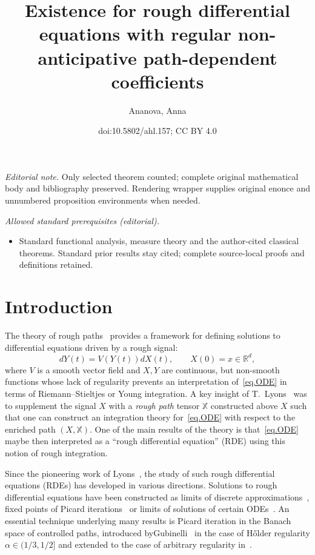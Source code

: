 \documentclass[10pt]{amsart}
\title{Existence for rough differential equations with regular non-anticipative path-dependent coefficients}
\author{Ananova, Anna}
\date{doi:10.5802/ahl.157; CC BY 4.0}
\theoremstyle{definition}\newtheorem{defi}[theo]{Definition}\newtheorem{rema}[theo]{Remark}\newtheorem{exam}[theo]{Example}\newtheorem{exem}[theo]{Example}\newtheorem{nota}[theo]{Notation}
\newcommand{\bbX}{\mathbb{X}}
\newcommand{\Rr}{{\mathbb{R}}}
\begin{document}
\maketitle
\noindent\textit{Editorial note.} Only selected theorem counted; complete original mathematical body and bibliography preserved. Rendering wrapper supplies original enonce and unnumbered proposition environments when needed.\par\medskip
\noindent\textit{Allowed standard prerequisites (editorial).}\begin{itemize}
\item Standard functional analysis, measure theory and the author-cited classical theorems. Standard prior results stay cited; complete source-local proofs and definitions retained.
\end{itemize}\medskip




\section{Introduction}

The theory of rough paths~\cite{lyons} provides a framework for defining solutions to differential equations driven by a rough signal:
\begin{equation}\label{eq.ODE}
dY(t)= V(Y(t)) dX(t),\qquad X(0)=x\in \Rr^d,
\end{equation}
where $V$ is a smooth vector field and $X, Y$ are continuous, but non-smooth functions whose lack of regularity prevents an interpretation of~\eqref{eq.ODE} in terms of Riemann--Stieltjes or Young integration. A key insight of T.~Lyons~\cite{lyons98} was to supplement the signal $X$ with a \emph{rough path} tensor $\bbX$ constructed above $X$ such that one can construct an integration theory for~\eqref{eq.ODE} with respect to the enriched path $(X,\bbX)$. One of the main results of the theory is that~\eqref{eq.ODE} maybe then interpreted as a ``rough differential equation'' (RDE) using this notion of rough integration.

Since the pioneering work of Lyons~\cite{lyons98,lyons2007}, the study of such rough differential equations (RDEs) has developed in various directions. Solutions to rough differential equations have been constructed as limits of discrete approximations~\cite{davie2008}, fixed points of Picard iterations~\cite{frizhairer,gubinelli2004,lyons2007,lyons98} or limits of solutions of certain ODEs~\cite{bailleul2015, frizvictoir}. An essential technique underlying many results is Picard iteration in the Banach space of controlled paths, introduced by\linebreak Gubinelli~\cite{gubinelli2004} in the case of H\H older regularity $\alpha\in (1/3,1/2]$ and extended to the case of arbitrary regularity in~\cite{gubinelli2010,hairer2014}.
\end{document}
